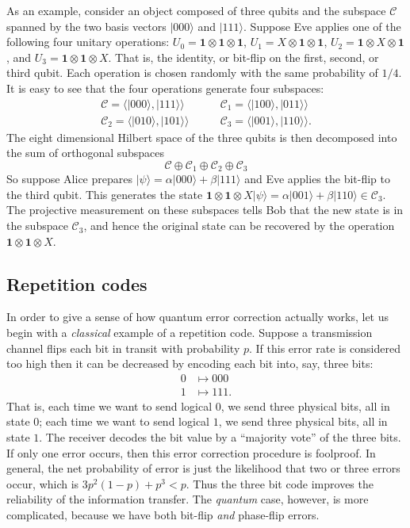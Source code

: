 \documentclass[fleqn]{article}
\begin{document}
As an example, consider an object composed of three qubits and the subspace \(\mathcal{C}\) spanned by the two basis vectors \(|000\rangle\) and \(|111\rangle\).
Suppose Eve applies one of the following four unitary operations: \(U_0=\mathbf{1}\otimes\mathbf{1}\otimes \mathbf{1}\), \(U_1 =X\otimes\mathbf{1}\otimes \mathbf{1}\), \(U_2 =\mathbf{1}\otimes X\otimes \mathbf{1}\), and \(U_3=\mathbf{1}\otimes\mathbf{1}\otimes X\).
That is, the identity, or bit-flip on the first, second, or third qubit.
Each operation is chosen randomly with the same probability of \(1/4\).
It is easy to see that the four operations generate four subspaces:
\[
  \begin{aligned}
    \mathcal{C} = \Big\langle|000\rangle,|111\rangle\Big\rangle &\qquad \mathcal{C}_1 = \Big\langle|100\rangle,|011\rangle\Big\rangle
  \\\mathcal{C}_2 = \Big\langle|010\rangle,|101\rangle\Big\rangle& \qquad \mathcal{C}_3 = \Big\langle|001\rangle,|110\rangle\Big\rangle.
  \end{aligned}
\]
The eight dimensional Hilbert space of the three qubits is then decomposed into the sum of orthogonal subspaces
\[
\mathcal{C} \oplus \mathcal{C}_1 \oplus\mathcal{C}_2 \oplus \mathcal{C}_3
\]
So suppose Alice prepares \(|\psi\rangle=\alpha|000\rangle+\beta|111\rangle\) and Eve applies the bit-flip to the third qubit.
This generates the state \(\mathbf{1}\otimes\mathbf{1}\otimes X|\psi\rangle=\alpha|001\rangle+\beta|110\rangle\in \mathcal{C}_3\).
The projective measurement on these subspaces tells Bob that the new state is in the subspace \(\mathcal{C}_3\), and hence the original state can be recovered by the operation \(\mathbf{1}\otimes\mathbf{1}\otimes X\).

\hypertarget{repetition-codes}{%
\subsection{Repetition codes}\label{repetition-codes}}

In order to give a sense of how quantum error correction actually works, let us begin with a \emph{classical} example of a repetition code.
Suppose a transmission channel flips each bit in transit with probability \(p\).
If this error rate is considered too high then it can be decreased by encoding each bit into, say, three bits:
\[
  \begin{aligned}
    0 &\mapsto 000
  \\1 &\mapsto 111.
  \end{aligned}
\]
That is, each time we want to send logical \(0\), we send three physical bits, all in state \(0\); each time we want to send logical \(1\), we send three physical bits, all in state \(1\).
The receiver decodes the bit value by a ``majority vote'' of the three bits.
If only one error occurs, then this error correction procedure is foolproof.
In general, the net probability of error is just the likelihood that two or three errors occur, which is \(3p^2(1-p) + p^3 < p\).
Thus the three bit code improves the reliability of the information transfer.
The \emph{quantum} case, however, is more complicated, because we have both bit-flip \emph{and} phase-flip errors.
\end{document}
